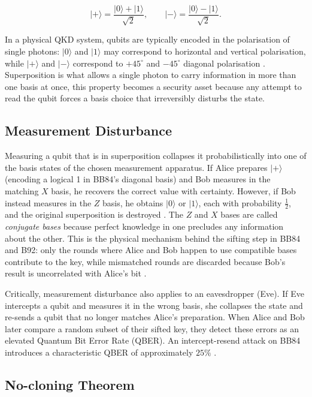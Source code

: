 \documentclass[10pt, a4paper]{report}
\newcommand{\ket}[1]{\ensuremath{|#1\rangle}}
\begin{document}
%
\begin{equation}
\label{eq:diag-basis}
\ket{+} = \frac{\ket{0}+\ket{1}}{\sqrt{2}}, \qquad
\ket{-} = \frac{\ket{0}-\ket{1}}{\sqrt{2}}.
\end{equation}
%

In a physical QKD system, qubits are typically encoded in the polarisation of single photons: $\ket{0}$ and $\ket{1}$ may correspond to horizontal and vertical polarisation, while $\ket{+}$ and $\ket{-}$ correspond to $+45^{\circ}$ and $-45^{\circ}$ diagonal polarisation \cite{BB84}. Superposition is what allows a single photon to carry information in more than one basis at once, this property becomes a security asset because any attempt to read the qubit forces a basis choice that irreversibly disturbs the state.

\subsection{Measurement Disturbance}
Measuring a qubit that is in superposition collapses it probabilistically into one of the basis states of the chosen measurement apparatus. If Alice prepares $\ket{+}$ (encoding a logical 1 in BB84's diagonal basis) and Bob measures in the matching $X$ basis, he recovers the correct value with certainty. However, if Bob instead measures in the $Z$ basis, he obtains $\ket{0}$ or $\ket{1}$, each with probability $\frac{1}{2}$, and the original superposition is destroyed \cite{QKDbible}. The $Z$ and $X$ bases are called \textit{conjugate bases} because perfect knowledge in one precludes any information about the other. This is the physical mechanism behind the sifting step in BB84 and B92: only the rounds where Alice and Bob happen to use compatible bases contribute to the key, while mismatched rounds are discarded because Bob's result is uncorrelated with Alice's bit \cite{BB84, B92}.

Critically, measurement disturbance also applies to an eavesdropper (Eve). If Eve intercepts a qubit and measures it in the wrong basis, she collapses the state and re-sends a qubit that no longer matches Alice's preparation. When Alice and Bob later compare a random subset of their sifted key, they detect these errors as an elevated Quantum Bit Error Rate (QBER). An intercept-resend attack on BB84 introduces a characteristic QBER of approximately $25\%$ \cite{Scarani2009, ShorPreskill2000}. %


\subsection{No-cloning Theorem}
\end{document}
